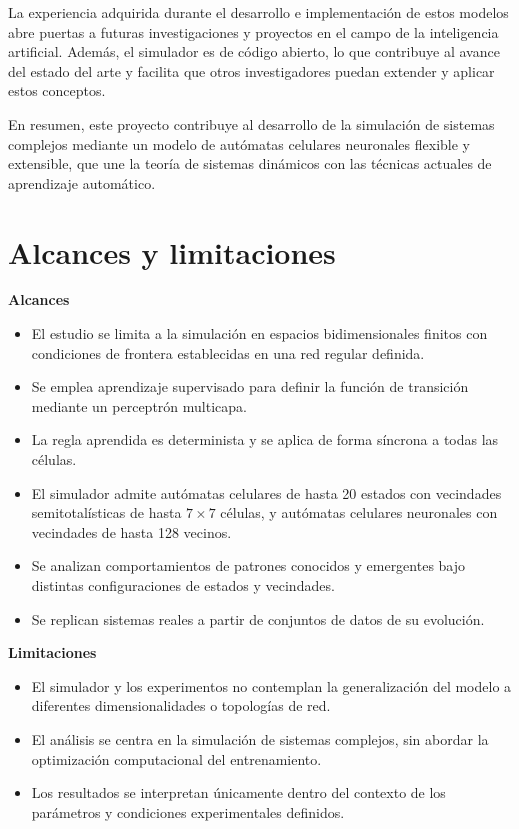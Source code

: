 La experiencia adquirida durante el desarrollo e implementación de estos modelos abre puertas a futuras investigaciones y proyectos en el campo de la inteligencia artificial. Además, el simulador es de código abierto, lo que contribuye al avance del estado del arte y facilita que otros investigadores puedan extender y aplicar estos conceptos.

En resumen, este proyecto contribuye al desarrollo de la simulación de sistemas complejos mediante un modelo de autómatas celulares neuronales flexible y extensible, que une la teoría de sistemas dinámicos con las técnicas actuales de aprendizaje automático.

\section{Alcances y limitaciones}

\textbf{Alcances}

\begin{itemize}
	
	\item El estudio se limita a la simulación en espacios bidimensionales finitos con condiciones de frontera establecidas en una red regular definida.
	
	\item Se emplea aprendizaje supervisado para definir la función de transición mediante un perceptrón multicapa.
	
	\item La regla aprendida es determinista y se aplica de forma síncrona a todas las células.
	
	\item El simulador admite autómatas celulares de hasta 20 estados con vecindades semitotalísticas de hasta $7 \times 7$ células, y autómatas celulares neuronales con vecindades de hasta 128 vecinos.
	
	\item Se analizan comportamientos de patrones conocidos y emergentes bajo distintas configuraciones de estados y vecindades.
	
	\item Se replican sistemas reales a partir de conjuntos de datos de su evolución.
	
\end{itemize}

\textbf{Limitaciones}

\begin{itemize}
	
	\item El simulador y los experimentos no contemplan la generalización del modelo a diferentes dimensionalidades o topologías de red.
	
	\item El análisis se centra en la simulación de sistemas complejos, sin abordar la optimización computacional del entrenamiento.
	
	\item Los resultados se interpretan únicamente dentro del contexto de los parámetros y condiciones experimentales definidos.
	
\end{itemize}

